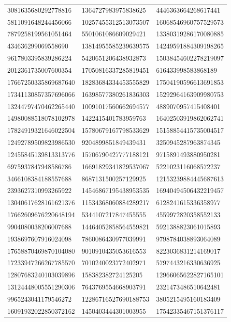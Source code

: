 \begin{longtable}{*{3}{l}}
3081635680292778816&1364727983975838625&4446363664268617441\\
5811091648244456066&10257455312513073507&16068546960757529573\\
7879258199561051464&5501061086609029421&13380319286170080885\\
434636299069558690&13814955585239639575&14249591884309198265\\
9617803395839286224&5420651206438932873&15038454602278219097\\
2012361735007600354&17050816337285819451&616433998583868189\\
17667250335869687640&18283684334453555829&17504190596613691853\\
17341130857357696066&16398577380261836303&15292964163909980753\\
13244797470462265440&10091017560662694577&4889070957415408401\\
14980088518078102978&1422415401783959763&16402503919862062741\\
17824919321646022504&15780679167798533629&15158854415735004517\\
12492789509823986530&9204899851849439431&3250945287963874345\\
12455845139813313776&15706790427777188121&9715891493880950281\\
6975937847948586786&16691829341829537067&5221023116068572237\\
3466108384188557688&8687131500257129925&12153239884445687613\\
2393627310993265922&14546867195438953535&16940494506432219457\\
13040617628161621376&11534368060884289217&6128241615336358977\\
17662609676220648194&5344107217847455555&4559972820358552133\\
9904080038206007688&14464052858564559821&5921388823061015893\\
1938697607916024098&7860086430977039991&9798784038893064089\\
17658870469870104080&9010910435053616553&8223036831214169017\\
17233947266267785570&7010240023772402971&5797443216330636925\\
12807683240103039896&158382382724125205&12966065622827165101\\
13124448005551290306&7643769554668903791&2321473486510642481\\
9965243041179546272&12286716527690188753&3805215495160183409\\
16091932022850372162&1450403444301003955&17542335467151376117\\

\end{longtable}
